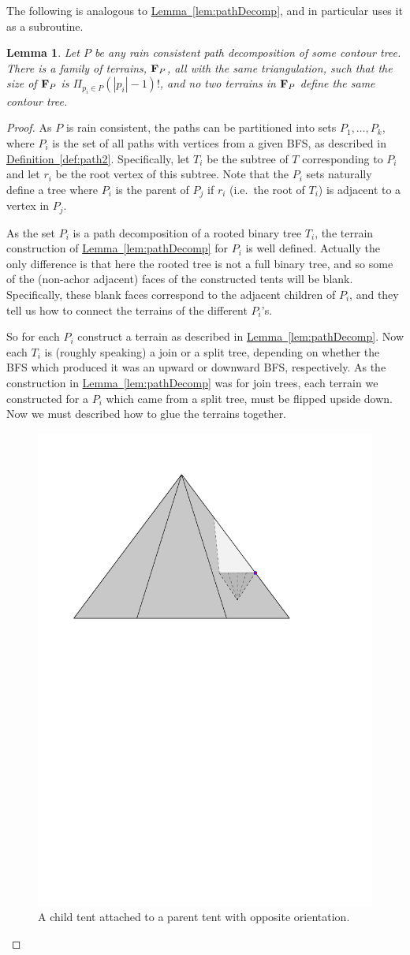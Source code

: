 \documentclass[11pt]{article}
\newtheorem{lemma}[theorem]{Lemma}
\theoremstyle{definition}
\newcommand{\bF}{{\bf F}}
\newcommand{\Lem}[1]{\hyperref[lem:#1]{Lemma~\ref*{lem:#1}}} %
\newcommand{\Def}[1]{\hyperref[def:#1]{Definition~\ref*{def:#1}}} %
\begin{document}
The following is analogous to \Lem{pathDecomp}, and in particular uses it as a subroutine.

\begin{lemma}
\label{lem:pathDecomp2}
Let $P$ be any rain consistent path decomposition of some contour tree. 
There is a family of terrains, $\bF_P$, all with the same triangulation, 
such that the size of $\bF_P$ is $\Pi_{p_i\in P} (|p_i|-1)!$, and no two terrains in $\bF_P$ define the same contour tree.
\end{lemma}
\begin{proof}
 As $P$ is rain consistent, the paths can be partitioned into sets $P_1, \dots, P_k$, where $P_i$ is the set of all paths with 
 vertices from a given BFS, as described in \Def{path2}.  Specifically, let $T_i$ be the subtree of $T$ corresponding to $P_i$ and 
 let $r_i$ be the root vertex of this subtree.  
 Note that the $P_i$ sets naturally define a tree where $P_i$ is the parent of $P_j$ if $r_i$ (i.e.\ the root of $T_i$) is adjacent to a vertex in $P_j$.  
 
 As the set $P_i$ is a path decomposition of a rooted binary tree $T_i$, the terrain construction of \Lem{pathDecomp} for $P_i$ is well defined.  
 Actually the only difference is that here the rooted tree is not a full binary tree, and so some of the (non-achor adjacent) faces of the constructed tents will be blank.  
 Specifically, these blank faces correspond to the adjacent children of $P_i$, and they tell us how to connect the terrains of the different $P_i$'s.
 
 So for each $P_i$ construct a terrain as described in \Lem{pathDecomp}.  Now each $T_i$ is (roughly speaking) a join or a split tree, depending on 
 whether the BFS which produced it was an upward or downward BFS, respectively.  As the construction in \Lem{pathDecomp} was for join trees, each terrain 
 we constructed for a $P_i$ which came from a split tree, must be flipped upside down.
 Now we must described how to glue the terrains together.
  
 \begin{figure}[h]\centering
    \includegraphics[width=.28\linewidth]{figs/cones2}
    \caption{A child tent attached to a parent tent with opposite orientation.}
    \label{fig:diamond2}
\end{figure} 
  

\end{proof}
\end{document}
